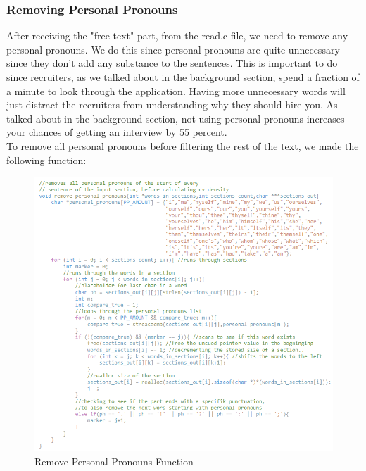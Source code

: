 \subsubsection{Removing Personal Pronouns}
After receiving the "free text" part, from the read.c file, we need to remove any personal pronouns.
We do this since personal pronouns are quite unnecessary since they don't add any substance to the sentences.
This is important to do since recruiters, as we talked about in the background section, spend a fraction of a minute
to look through the application. 
Having more unnecessary words will just distract the recruiters from understanding why they should hire you.
As talked about in the background section, not using personal pronouns increases your
chances of getting an interview by 55 percent.
\\
To remove all personal pronouns before filtering the rest of the text, we made the following function:
\begin{figure}[H]
  \centering
  \includegraphics[scale = 1]{figures/personal_pronoun_v2.png}
  \caption{Remove Personal Pronouns Function}\label{fig:personal_pronoun_v2}
\end{figure}

